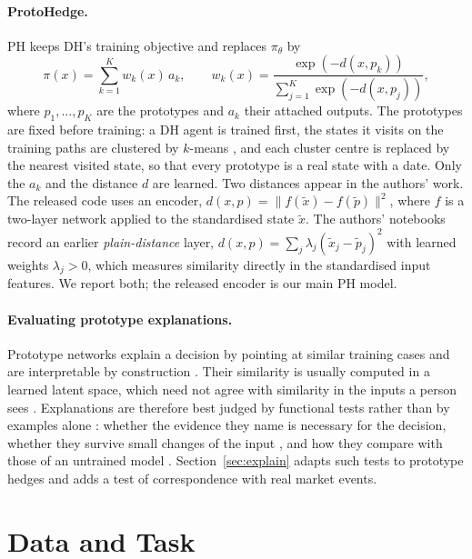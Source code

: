\documentclass[runningheads]{llncs}
\begin{document}
\paragraph{ProtoHedge.} PH keeps DH's training objective and replaces $\pi_\theta$ by
\begin{equation}
\pi(x)=\sum_{k=1}^{K} w_k(x)\,a_k,\qquad w_k(x)=\frac{\exp(-d(x,p_k))}{\sum_{j=1}^{K}\exp(-d(x,p_j))},
\label{eq:proto}
\end{equation}
where $p_1,\dots,p_K$ are the prototypes and $a_k$ their attached outputs. The prototypes are fixed before
training: a DH agent is trained first, the states it visits on the training paths are clustered by $k$-means
\cite{macqueen1967}, and each cluster centre is replaced by the nearest visited state, so that every
prototype is a real state with a date. Only the $a_k$ and the distance $d$ are learned. Two distances appear
in the authors' work. The released code uses an encoder, $d(x,p)=\lVert f(\tilde x)-f(\tilde p)\rVert^2$,
where $f$ is a two-layer network applied to the standardised state $\tilde x$. The authors' notebooks record
an earlier \emph{plain-distance} layer, $d(x,p)=\sum_j\lambda_j(\tilde x_j-\tilde p_j)^2$ with learned
weights $\lambda_j>0$, which measures similarity directly in the standardised input features. We report
both; the released encoder is our main PH model.

\paragraph{Evaluating prototype explanations.} Prototype networks explain a decision by pointing at similar
training cases \cite{li2018prototypes,chen2019looks} and are interpretable by construction
\cite{rudin2019stop}. Their similarity is usually computed in a learned latent space, which need not agree
with similarity in the inputs a person sees \cite{hoffmann2021looks}. Explanations are therefore best judged
by functional tests rather than by examples alone \cite{doshivelez2017rigorous,nauta2023anecdotal}: whether
the evidence they name is necessary for the decision, whether they survive small changes of the input
\cite{alvarezmelis2018robustness}, and how they compare with those of an untrained model
\cite{adebayo2018sanity}. Section~\ref{sec:explain} adapts such tests to prototype hedges and adds a test of
correspondence with real market events.

\section{Data and Task}
\label{sec:data}
\end{document}
